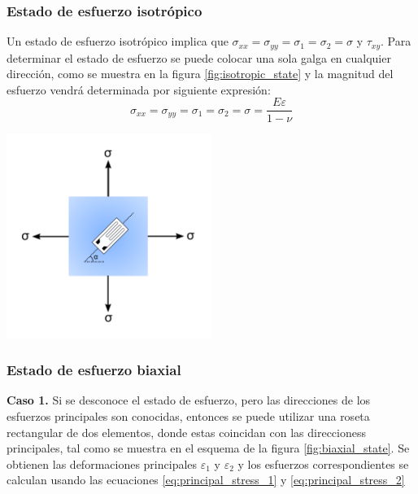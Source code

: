 \subsubsection*{Estado de esfuerzo isotrópico}

Un estado de esfuerzo isotrópico implica que $\sigma_{xx} = \sigma_{yy} = \sigma_1 = \sigma_2 = \sigma$ y 
$\tau_{xy}$. Para determinar el estado de esfuerzo se puede colocar una sola galga en cualquier dirección, 
como se muestra en la figura \ref{fig:isotropic_state} y la magnitud del esfuerzo vendrá 
determinada por siguiente expresión:\\

\begin{equation}
\sigma_{xx} = \sigma_{yy} = \sigma_1 = \sigma_2 = \sigma = \frac{E\varepsilon}{1-\nu}
\end{equation}

\begin{center}
\includegraphics[width=0.5\textwidth]{src/ch2/isotropic_state.pdf}
\label{fig:isotropic_state}
\end{center}

\subsubsection*{Estado de esfuerzo biaxial}

\textbf{Caso 1.} Si se desconoce el estado de esfuerzo, pero las direcciones de los 
esfuerzos principales son conocidas, entonces se puede utilizar una roseta rectangular 
de dos elementos, donde estas coincidan con las direccioness principales, tal 
como se muestra en el esquema de la figura \ref{fig:biaxial_state}. Se obtienen las 
deformaciones principales $\varepsilon_1$ y $\varepsilon_2$ y los esfuerzos correspondientes 
se calculan usando las ecuaciones \ref{eq:principal_stress_1} y \ref{eq:principal_stress_2}  ~\cite{metu2011}

